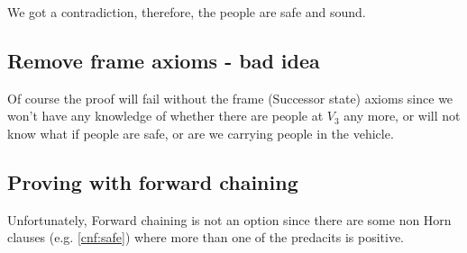\documentclass{article}                     %
\begin{document}
	We got a contradiction, therefore, the people are safe and sound. 
	
	

	\subsection{Remove frame axioms - bad idea}
	Of course the proof will fail without the frame (Successor state) axioms since we won't have any knowledge of whether there are people at $ V_3 $ any more, or will not know what if people are safe, or are we carrying people in the vehicle.
	
	\subsection{Proving with forward chaining}
	Unfortunately, Forward chaining is not an option since there are some non Horn clauses (e.g. \eqref{cnf:safe}) where more than one of the predacits is positive. 
\end{document}
